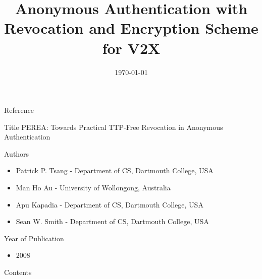 \documentclass[
	xcolor={svgnames},
	hyperref={pagebackref,bookmarks},
	aspectratio=43,
]{beamer}
\title[]{Anonymous Authentication with Revocation and Encryption Scheme for V2X}
\title{\presentationtitle}
\author{\presenter}
\institute[IITH]{
	\university\\
}
\date{\today}
\begin{document}

\newcommand{\brak}[1]{\ensuremath{\left( #1 \right)}}
\newcommand{\sbrak}[1]{\ensuremath{\left[ #1 \right]}}
\newcommand{\Exp}[1]{\ensuremath{\mathbb{E} \left[ #1 \right]}}
\newcommand{\Var}[1]{\ensuremath{\text{Var} \left[ #1 \right]}}

\begin{frame}
	\titlepage
\end{frame}


\begin{frame}{Reference}
	\begin{block}{Title}
		PEREA: Towards Practical TTP-Free Revocation in Anonymous Authentication
	\end{block}
	\begin{block}{Authors}
		\begin{itemize}
			\item Patrick P. Tsang - Department of CS, Dartmouth College, USA
			\item Man Ho Au - University of Wollongong, Australia
			\item Apu Kapadia - Department of CS, Dartmouth College, USA
			\item Sean W. Smith - Department of CS, Dartmouth College, USA
		\end{itemize}
	\end{block}
	\begin{block}{Year of Publication}
		\begin{itemize}
			\item 2008
		\end{itemize}
	\end{block}
\end{frame}

\begin{frame}{Contents}
	\tableofcontents
\end{frame}
\end{document}
